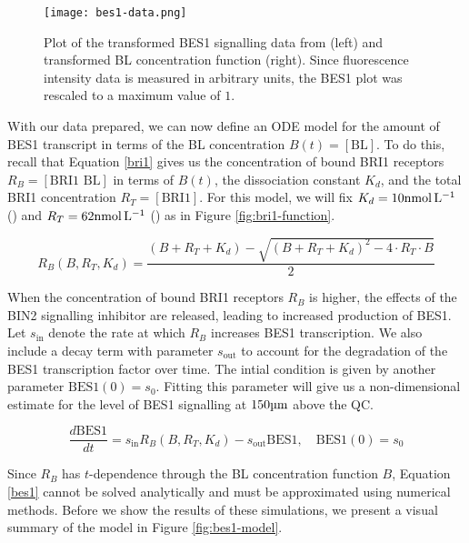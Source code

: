 \begin{figure}[!htb]
    \centering
    \texttt{[image: bes1-data.png]}
    \caption{Plot of the transformed BES1 signalling data from \cite{vukasinovic2021} (left) and transformed BL concentration function (right). Since fluorescence intensity data is measured in arbitrary units, the BES1 plot was rescaled to a maximum value of $1$.}
    \label{fig:bes1-data}
\end{figure}

\medskip

With our data prepared, we can now define an ODE model for the amount of BES1 transcript in terms of the BL concentration $B(t) = [\text{BL}]$. To do this, recall that Equation \eqref{bri1} gives us the concentration of bound BRI1 receptors $R_{B} = [\text{BRI1 BL}]$ in terms of $B(t)$, the dissociation constant $K_{d}$, and the total BRI1 concentration $R_{T} = [\text{BRI1}]$. For this model, we will fix $K_{d} = 10\nm$ (\cite{wang2001}) and $R_{T} = 62\nm$ (\cite{vanesse2012}) as in Figure \ref{fig:bri1-function}.

\begin{equation}
\label{rb}
R_{B}(B, R_{T}, K_{d}) = \frac{(B + R_{T} + K_{d}) - \sqrt{(B + R_{T} + K_{d})^{2} - 4 \cdot R_{T} \cdot B}}{2}
\end{equation}


When the concentration of bound BRI1 receptors $R_{B}$ is higher, the effects of the BIN2 signalling inhibitor are released, leading to increased production of BES1. Let $s_{\text{in}}$ denote the rate at which $R_{B}$ increases BES1 transcription. We also include a decay term with parameter $s_{\text{out}}$ to account for the degradation of the BES1 transcription factor over time. The intial condition is given by another parameter $\text{BES1}(0) = s_{0}$. Fitting this parameter will give us a non-dimensional estimate for the level of BES1 signalling at $150\um$ above the QC. 

\begin{equation}
\label{bes1}
\frac{d\text{BES1}}{dt} = s_{\text{in}}R_{B}(B, R_{T}, K_{d}) - s_{\text{out}}\text{BES1},\quad \text{BES1}(0) = s_{0}
\end{equation}

Since $R_{B}$ has $t$-dependence through the BL concentration function $B$, Equation \eqref{bes1} cannot be solved analytically and must be approximated using numerical methods. Before we show the results of these simulations, we present a visual summary of the model in Figure \ref{fig:bes1-model}.


